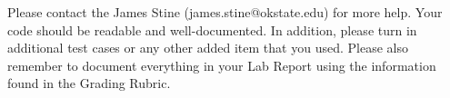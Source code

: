 \documentclass{article}
\begin{document}
Please contact
the James Stine
(james.stine@okstate.edu) 
for more help.  Your
code should be
readable and well-documented. In addition, please turn in additional
test cases or any other added item that you used. 
Please also remember to document everything in your Lab Report using
the information found in the Grading Rubric.

   


\end{document}

